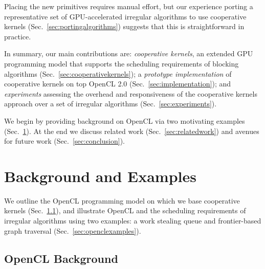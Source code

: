 \documentclass[parskip=half,sigconf,review, anonymous=true, acmcopyrightmode=none]{acmart}
\makeatletter
\newcommand{\cutthree}[1]{}
\renewcommand\paragraph{\@startsection{paragraph}{4}{\z@}%
  {-.5\baselineskip \@plus -2\p@ \@minus -.2\p@}%
  {-3.5\p@}%
  {\bfseries\@parfont}}
\newcommand{\mysec}{Sec.~}
\makeatother
\begin{document}
Placing the new primitives requires manual effort, but our experience porting a representative set of
GPU-accelerated irregular algorithms to use cooperative kernels
(\mysec\ref{sec:portingalgorithms}) suggests that this is straightforward in practice.

In summary, our main contributions are:
\emph{cooperative kernels}, an extended GPU programming model that supports the scheduling requirements of blocking algorithms (\mysec\ref{sec:cooperativekernels}); a \emph{prototype implementation} of cooperative
  kernels on top OpenCL 2.0
  (\mysec\ref{sec:implementation}); and \emph{experiments} assessing the overhead and responsiveness of the cooperative kernels approach over a set of irregular algorithms \cutthree{across three GPUs} (\mysec\ref{sec:experiments}).

We begin by providing background on OpenCL via two motivating examples (\mysec\ref{sec:background}).  At the end we discuss related work (\mysec\ref{sec:relatedwork}) and avenues for future work (\mysec\ref{sec:conclusion}).

\section{Background and Examples}\label{sec:background}

We outline the OpenCL programming model on which we
base cooperative kernels (\mysec\ref{sec:opencl}), and illustrate
OpenCL and the scheduling requirements of irregular algorithms using two examples: a work stealing queue and frontier-based graph traversal
(\mysec\ref{sec:openclexamples}).

\subsection{OpenCL Background}\label{sec:opencl}

\end{document}
